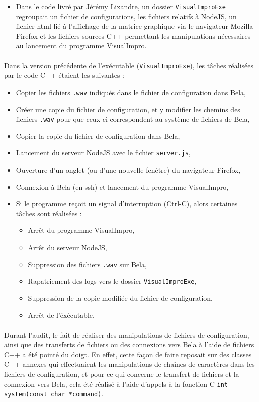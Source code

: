 \begin{itemize}
          \item Dans le code livré par Jérémy Lixandre, un dossier
            \verb!VisualImproExe! regroupait un fichier de
            configurations, les fichiers relatifs à NodeJS, un fichier
            html lié à l'affichage de la matrice graphique via le
            navigateur Mozilla Firefox et les fichiers sources C++
            permettant les manipulations nécessaires au lancement du
            programme VisualImpro.
\end{itemize}
\paragraph{}
Dans la version précédente de l'exécutable (\verb!VisualImproExe!), les tâches réalisées par le code C++ étaient les suivantes :
\begin{itemize}
  \item Copier les fichiers \verb!.wav! indiqués dans le fichier de configuration dans Bela,
  \item Créer une copie du fichier de configuration, et y modifier les chemins des fichiers \verb!.wav! pour que ceux ci correspondent au système de fichiers de Bela,
  \item Copier la copie du fichier de configuration dans Bela,
  \item Lancement du serveur NodeJS avec le fichier \verb!server.js!,
  \item Ouverture d'un onglet (ou d'une nouvelle fenêtre) du navigateur Firefox,
  \item Connexion à Bela (en ssh) et lancement du programme VisualImpro,
  \item Si le programme reçoit un signal d'interruption (Ctrl-C), alors certaines tâches sont réalisées :
  \begin{itemize}
    \item Arrêt du programme VisualImpro,
    \item Arrêt du serveur NodeJS,
    \item Suppression des fichiers \verb!.wav! sur Bela,
    \item Rapatriement des logs vers le dossier \verb!VisualImproExe!,
    \item Suppression de la copie modifiée du fichier de configuration,
    \item Arrêt de l'éxécutable.
  \end{itemize}
\end{itemize}
\paragraph{}
Durant l'audit, le fait de réaliser des manipulations de fichiers de configuration, ainsi que des transferts de fichiers ou des connexions vers Bela
à l'aide de fichiers C++ a été pointé du doigt. En effet, cette façon de faire reposait sur des classes C++ annexes qui effectuaient les manipulations de chaînes de caractères dans les fichiers de configuration, et pour ce qui concerne le transfert de fichiers et la connexion vers Bela, cela été réalisé à l'aide d'appels à la fonction C \verb!int system(const char *command)!.

